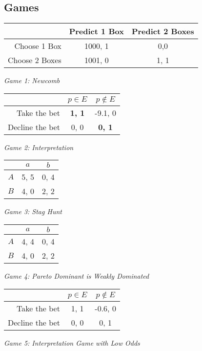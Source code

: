 \def\mytitle{Interests and Evidence}
\def\myauthor{Brian Weatherson}
\def\mydate{February 26, 2017}
\def\latexmode{Article}


\subsection*{Games}

\begin{center}
\begin{tabular}{r | c c}
& Predict 1 Box & Predict 2 Boxes \\ \hline
Choose 1 Box & 1000, 1 & 0,0 \\
Choose 2 Boxes & 1001, 0 & 1, 1
\end{tabular}

\medskip
\textit{Game 1: Newcomb}

\bigskip
\bigskip

\begin{tabular}{r | c c}
& $p \in E$ & $p \notin E$ \\ \hline
Take the bet & \textbf{1, 1} & -9.1, 0 \\
Decline the bet & 0, 0 & \textbf{0, 1}
\end{tabular}

\medskip
\textit{Game 2: Interpretation}

\bigskip
\bigskip

\begin{tabular}{r | c c}
& $a$ & $b$  \\\hline
$A$ & 5, 5 & 0, 4 \\
$B$ & 4, 0 & 2, 2
\end{tabular}

\medskip
\textit{Game 3: Stag Hunt}

\bigskip
\bigskip

\begin{tabular}{r | c c}
& $a$ & $b$ \\ \hline
$A$ & 4, 4 & 0, 4 \\
$B$ & 4, 0 & 2, 2
\end{tabular}

\medskip
\textit{Game 4: Pareto Dominant is Weakly Dominated}

\bigskip
\bigskip

\begin{tabular}{r | c c}
& $p \in E$ & $p \notin E$ \\ \hline
Take the bet & 1, 1 & -0.6, 0 \\
Decline the bet & 0, 0 & 0, 1
\end{tabular}

\medskip
\textit{Game 5: Interpretation Game with Low Odds}
\end{center}

